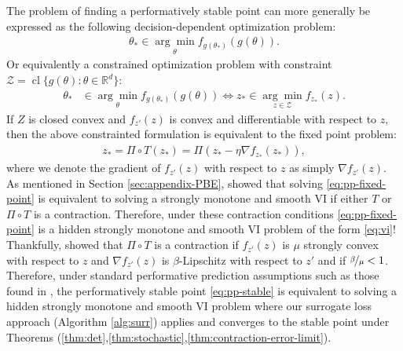 \documentclass{article} %
\theoremstyle{definition}
\newcommand{\reals}{\mathbb{R}}
\newcommand*\closure[1]{\operatorname{cl}#1}
\begin{document}
The problem of finding a performatively stable point can more generally be expressed as the following decision-dependent optimization problem: 
\begin{align}
    \theta_\ast \in \underset{\theta }{\arg \min } f_{g(\theta_\ast)}(g(\theta)).
\end{align}
Or equivalently a constrained optimization problem with constraint $\mathcal{Z} = \closure\{g(\theta) : \theta \in \reals^d\}$:
\begin{align*}
    \theta_\ast &\in \underset{\theta }{\arg \min } f_{g(\theta_\ast)}(g(\theta)) \Leftrightarrow z_\ast \in \underset{ z \in \mathcal{Z}}{\arg \min } f_{z_\ast}(z).
\end{align*}
If $Z$ is closed convex and $f_{z'}(z)$ is convex and differentiable with respect to $z$, then the above constrainted formulation is equivalent to the fixed point problem:
\begin{align}\label{eq:pp-fixed-point}
    z_{\ast} = \Pi \circ T (z_\ast) = \Pi(z_\ast -\eta \nabla f_{z_\ast}(z_\ast)),
\end{align}
where we denote the gradient of $f_{z'}(z)$ with respect to $z$ as simply $\nabla f_{z'}(z)$.
As mentioned in Section \ref{sec:appendix-PBE}, \citet{bertsekas2009projected} showed that solving \eqref{eq:pp-fixed-point} is equivalent to solving a strongly monotone and smooth VI if either $T$ or $\Pi \circ T$ is a contraction.
Therefore, under these contraction conditions \eqref{eq:pp-fixed-point} is a hidden strongly monotone and smooth VI problem of the form \eqref{eq:vi}! 
Thankfully, \citep{drusvyatskiy2023stochastic, cheng2020online} showed that $\Pi \circ T$ is a contraction if $f_{z'}(z)$ is $\mu$ strongly convex with respect to $z$ and $\nabla f_{z'}(z)$ is $\beta$-Lipschitz with respect to $z'$ and if $\nicefrac{\beta}{\mu} < 1$.
Therefore, under standard performative prediction assumptions such as those found in \citet{drusvyatskiy2023stochastic}, the performatively stable point \eqref{eq:pp-stable} is equivalent to solving a hidden strongly monotone and smooth VI problem where our surrogate loss approach (Algorithm \eqref{alg:surr}) applies and converges to the stable point under Theorems (\ref{thm:det},\ref{thm:stochastic},\ref{thm:contraction-error-limit}). 
\end{document}
